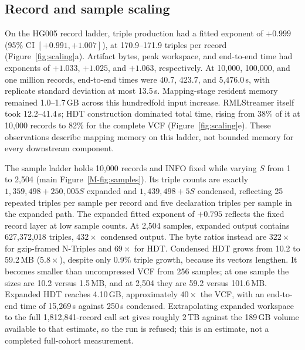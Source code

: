 \documentclass[11pt]{article}
\begin{document}
\subsection{Record and sample scaling}\label{subsec:measurements-scaling}
On the HG005 record ladder, triple production had a fitted exponent of $+0.999$ (95\% CI $[+0.991,+1.007]$), at 170.9--171.9 triples per record (Figure~\ref{fig:scaling}a).
Artifact bytes, peak workspace, and end-to-end time had exponents of $+1.033$, $+1.025$, and $+1.063$, respectively.
At 10,000, 100,000, and one million records, end-to-end times were 40.7, 423.7, and 5,476.0\,s, with replicate standard deviation at most 13.5\,s.
Mapping-stage resident memory remained 1.0--1.7\,GB across this hundredfold input increase.
RMLStreamer itself took 12.2--41.4\,s; HDT construction dominated total time, rising from 38\% of it at 10,000 records to 82\% for the complete VCF (Figure~\ref{fig:scaling}e).
These observations describe mapping memory on this ladder, not bounded memory for every downstream component.

The sample ladder holds 10,000 records and INFO fixed while varying $S$ from 1 to 2,504 (main Figure~\ref{M-fig:samples}).
Its triple counts are exactly $1{,}359{,}498+250{,}005S$ expanded and $1{,}439{,}498+5S$ condensed, reflecting 25 repeated triples per sample per record and five declaration triples per sample in the expanded path.
The expanded fitted exponent of $+0.795$ reflects the fixed record layer at low sample counts.
At 2,504 samples, expanded output contains 627,372,018 triples, $432\times$ condensed output.
The byte ratios instead are $322\times$ for gzip-framed N-Triples and $69\times$ for HDT.
Condensed HDT grows from 10.2 to 59.2\,MB ($5.8\times$), despite only 0.9\% triple growth, because its vectors lengthen.
It becomes smaller than uncompressed VCF from 256 samples; at one sample the sizes are 10.2 versus 1.5\,MB, and at 2,504 they are 59.2 versus 101.6\,MB.
Expanded HDT reaches 4.10\,GB, approximately $40\times$ the VCF, with an end-to-end time of 15,269\,s against 250\,s condensed.
Extrapolating expanded workspace to the full 1,812,841-record call set gives roughly 2\,TB against the 189\,GB volume available to that estimate, so the run is refused; this is an estimate, not a completed full-cohort measurement.
\end{document}
